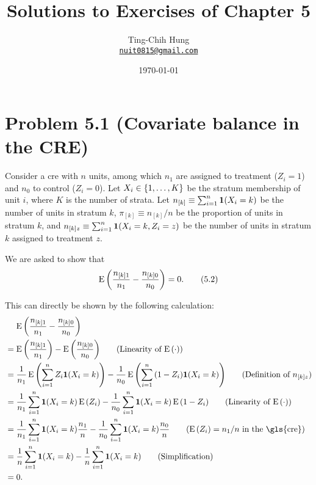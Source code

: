 \documentclass[10pt]{article}
\title{Solutions to Exercises of Chapter 5}
\author{Ting-Chih Hung \\ \href{mailto:nuit0815@gmail.com}{\texttt{nuit0815@gmail.com}}}
\date{\today}
\begin{document}
\maketitle

\section*{Problem 5.1 (Covariate balance in the CRE)}

Consider a \gls{cre} with $n$ units, 
among which $n_1$ are assigned to treatment ($Z_i = 1$)
and $n_0$ to control ($Z_i = 0$).
Let $X_i \in {\left\lbrace 1, \ldots, K \right\rbrace}$ be the stratum membership of unit $i$,
where $K$ is the number of strata.
Let $n_{[k]} \equiv \sum_{i=1}^n \mathbf{1}{\left( X_i = k \right)}$ be the number of units in stratum $k$,
$\pi_{[k]} \equiv n_{[k]}/n$ be the proportion of units in stratum $k$,
and $n_{[k]z} \equiv \sum_{i=1}^n \mathbf{1}{\left( X_i = k, Z_i = z \right)}$ 
be the number of units in stratum $k$ assigned to treatment $z$.

We are asked to show that
\begin{align}
  \operatorname{E}{\left( \frac{n_{[k]1}}{n_1} - \frac{n_{[k]0}}{n_0} \right)} = 0. \tag{5.2}
\end{align}

This can directly be shown by the following calculation:
\begin{align*}
  &\mathrel{\phantom{=}} \E\bp{\frac{n_{[k]1}}{n_1} - \frac{n_{[k]0}}{n_0}} \\
  &= \E\bp{\frac{n_{[k]1}}{n_1}} - \E\bp{\frac{n_{[k]0}}{n_0}} \tag{Linearity of $\E\bp{\cdot}$} \\
  &= \frac{1}{n_1} \E\bp{\sum_{i = 1}^n Z_i \mathbf{1}\bp{X_i = k}} 
  - \frac{1}{n_0} \E\bp{\sum_{i = 1}^n \bp{1 - Z_i}\mathbf{1}\bp{X_i = k}} 
    \tag{Definition of $n_{[k]z}$} \\
  &= \frac{1}{n_1} \sum_{i = 1}^n \mathbf{1}\bp{X_i = k} \E\bp{Z_i}
  - \frac{1}{n_0} \sum_{i = 1}^n \mathbf{1}\bp{X_i = k} \E\bp{1 - Z_i} 
    \tag{Linearity of $\E\bp{\cdot}$} \\
  &= \frac{1}{n_1} \sum_{i = 1}^n \mathbf{1}\bp{X_i = k} \frac{n_1}{n}
  - \frac{1}{n_0} \sum_{i = 1}^n \mathbf{1}\bp{X_i = k} \frac{n_0}{n} 
    \tag{$\E\bp{Z_i} = n_1/n$ in the \gls{cre}} \\
  &= \frac{1}{n} \sum_{i = 1}^n \mathbf{1}\bp{X_i = k}
  - \frac{1}{n} \sum_{i = 1}^n \mathbf{1}\bp{X_i = k} 
    \tag{Simplification} \\
  &= 0.
\end{align*}
\end{document}
